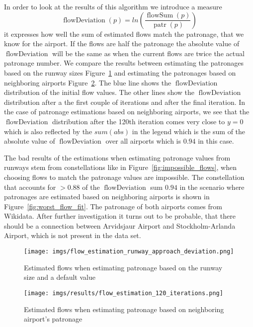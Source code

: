 \documentclass[twocolumn]{tum-article}
\DeclareMathOperator{\patronage}{patr}
\DeclareMathOperator{\flowSum}{flowSum}
\DeclareMathOperator{\flowDeviation}{flowDeviation}
\begin{document}
In order to look at the results of this algorithm we introduce a measure 
\begin{equation}
\flowDeviation(p) = ln\left(\dfrac{\flowSum(p)}{\patronage(p)}\right)
\end{equation}
it expresses how well the sum of estimated flows match the patronage, that we know for the airport. If the flows are half the patronage the absolute value of $\flowDeviation$ will be the same as when the current flows are twice the actual patronage number. 
We compare the results between estimating the patronages based on the runway sizes Figure~\ref{fig:flow_deviation_runway} and estimating the patronages based on neighboring airports Figure~\ref{fig:flow_deviation}. 
The blue line shows the $\flowDeviation$ distribution of the initial flow values.
The other lines show the $\flowDeviation$ distribution after a the first couple of iterations and after the final iteration. 
In the case of patronage estimations based on neighboring airports, we see that the $\flowDeviation$ distribution after the 120th iteration comes very close to $y=0$ which is also reflected by the $sum(abs)$ in the legend which is the sum of the absolute value of $\flowDeviation$ over all airports which is $0.94$ in this case.

The bad results of the estimations when estimating patronage values from runways stem from constellations like in Figure~\ref{fig:impossible_flows}, when choosing flows to match the patronage values are impossible. 
The constellation that accounts for $>0.88$ of the $\flowDeviation$ sum $0.94$ in the scenario where patronages are estimated based on neighboring airports is shown in Figure~\ref{fig:worst_flow_fit}. 
The patronage of both airports comes from Wikidata. After further investigation it turns out to be probable, that there should be a connection between Arvidsjaur Airport and Stockholm-Arlanda Airport, which is not present in the data set. 

\begin{figure}[h]
	\centering
	\texttt{[image: imgs/flow\_estimation\_runway\_approach\_deviation.png]}
	\caption{
Estimated flows when estimating patronage based on the runway size and a default value}
	\label{fig:flow_deviation_runway}
\end{figure}

\begin{figure}[h]
	\centering
	\texttt{[image: imgs/results/flow\_estimation\_120\_iterations.png]}
	\caption{
Estimated flows when estimating patronage based on neighboring airport's patronage}
	\label{fig:flow_deviation}
\end{figure}
\end{document}
